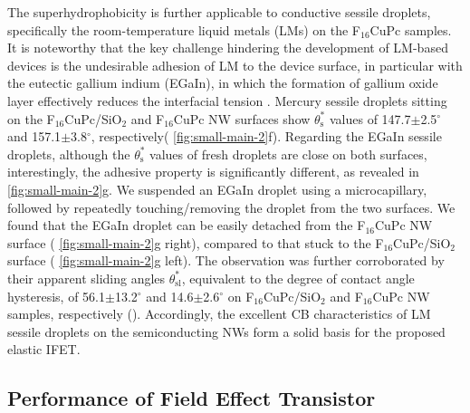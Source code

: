 The superhydrophobicity is further applicable to conductive sessile droplets,
specifically the room-temperature liquid metals\cite{Dickey_2008_EGAIN} (LMs) on the
F\(_{\text{16}}\)CuPc samples.
%
It is noteworthy that the key challenge hindering
the development of LM-based devices is the undesirable adhesion of LM
to the device surface, in particular with the eutectic gallium indium
(EGaIn), in which the formation of gallium oxide layer effectively
reduces the interfacial tension
\cite{Dickey_2008_EGAIN,Doudrick_2014_oxide}.
%
Mercury sessile droplets
sitting on the F\(_{\text{16}}\)CuPc/SiO\(_{\text{2}}\) and F\(_{\text{16}}\)CuPc NW surfaces show
\(\theta_{\mathrm{s}}^{*}\) values of 147.7\(\pm\)2.5\(^{\circ}\) and
157.1\(\pm\)3.8\(^{\circ}\), respectively( \autoref{fig:small-main-2}f).
Regarding the EGaIn sessile droplets, although the
\(\theta_{\mathrm{s}}^{*}\) values of fresh droplets are close on both
surfaces, interestingly, the adhesive property is significantly
different, as revealed in  \autoref{fig:small-main-2}g. We suspended an
EGaIn droplet using a microcapillary, followed by repeatedly
touching/removing the droplet from the two surfaces. We found that
the EGaIn droplet can be easily detached from the F\(_{\text{16}}\)CuPc NW
surface ( \autoref{fig:small-main-2}g right), compared to that stuck to the
F\(_{\text{16}}\)CuPc/SiO\(_{\text{2}}\) surface ( \autoref{fig:small-main-2}g left). The observation was further corroborated
by their apparent sliding angles \(\theta_{\mathrm{sl}}^{*}\),
equivalent to the degree of contact angle hysteresis, of
56.1\(\pm\)13.2\(^{\circ}\) and 14.6\(\pm\)2.6\(^{\circ}\) on
F\(_{\text{16}}\)CuPc/SiO\(_{\text{2}}\) and F\(_{\text{16}}\)CuPc NW samples, respectively (). Accordingly, the excellent CB
characteristics of LM sessile droplets on the semiconducting NWs form
a solid basis for the proposed elastic IFET.



\subsection{Performance of Field Effect Transistor }
\label{sec:small-field-effect-trans}

